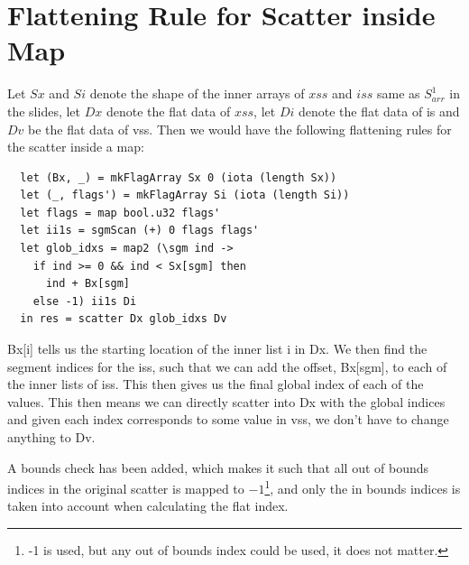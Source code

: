\section{Flattening Rule for Scatter inside Map}
Let $Sx$ and $Si$ denote the shape of the inner arrays of $xss$ and $iss$ same as $S^1_{arr}$ in
the slides, let $Dx$ denote the flat data of $xss$, let $Di$ denote the flat
data of is and $Dv$ be the flat data of vss. Then we would have the following
flattening rules for the scatter inside a map:
\begin{lstlisting}
  let (Bx, _) = mkFlagArray Sx 0 (iota (length Sx))
  let (_, flags') = mkFlagArray Si (iota (length Si))
  let flags = map bool.u32 flags'
  let ii1s = sgmScan (+) 0 flags flags'
  let glob_idxs = map2 (\sgm ind -> 
    if ind >= 0 && ind < Sx[sgm] then 
      ind + Bx[sgm] 
    else -1) ii1s Di
  in res = scatter Dx glob_idxs Dv
\end{lstlisting}

Bx[i] tells us the starting location of the inner list i in Dx. We then find
the segment indices for the iss, such that we can add the offset, Bx[sgm], to
each of the inner lists of iss. This then gives us the final global index of
each of the values. This then means we can directly scatter into Dx with the
global indices and given each index corresponds to some value in vss, we don't
have to change anything to Dv.

A bounds check has been added, which makes it such that all out of bounds
indices in the original scatter is mapped to $-1$\footnote{-1 is used, but any
out of bounds index could be used, it does not matter.}, and only the in bounds
indices is taken into account when calculating the flat index. 
